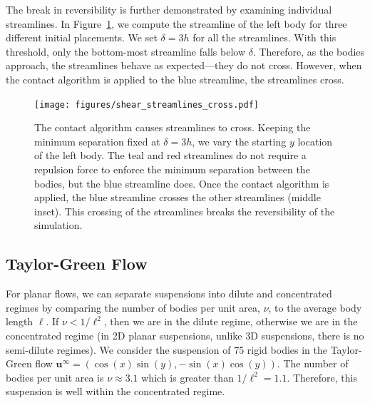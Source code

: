 \documentclass[preprint, 10pt]{elsarticle}
\begin{document}
The break in reversibility is further demonstrated by examining
individual streamlines.  In Figure~\ref{fig:shear_cross}, we compute the
streamline of the left body for three different initial placements.  We
set $\delta=3h$ for all the streamlines.  With this threshold, only the
bottom-most streamline falls below $\delta$.  Therefore, as the bodies approach, the streamlines behave as expected---they do
not cross.  However, when the contact algorithm is applied to the blue
streamline, the streamlines cross.

\begin{figure}[!h]
\begin{center}
\texttt{[image: figures/shear\_streamlines\_cross.pdf]}
\end{center}
\caption{\label{fig:shear_cross} The contact algorithm causes
streamlines to cross. Keeping the minimum separation fixed at
$\delta=3h$, we vary the starting $y$ location of the left body. The
teal and red streamlines do not require a repulsion force to enforce the
minimum separation between the bodies, but the blue streamline does.
Once the contact algorithm is applied, the blue streamline crosses the
other streamlines (middle inset). This crossing of the streamlines
breaks the reversibility of the simulation.}
\end{figure}


\subsection{Taylor-Green Flow}

For planar flows, we can separate suspensions into dilute and
concentrated regimes by comparing the number of bodies per unit area,
$\nu$, to the average body length $\ell$. If $\nu < 1/\ell^2$, then we
are in the dilute regime, otherwise we are in the concentrated regime
(in 2D planar suspensions, unlike 3D suspensions, there is no
semi-dilute regimes).  We consider the suspension of 75 rigid bodies in
the Taylor-Green flow $\mathbf{u}^\infty = (\cos(x)\sin(y),
-\sin(x)\cos(y))$.  The number of bodies per unit area is $\nu \approx
3.1$ which is greater than $1/\ell^2=1.1$.  Therefore, this suspension
is well within the concentrated regime. 
\end{document}
